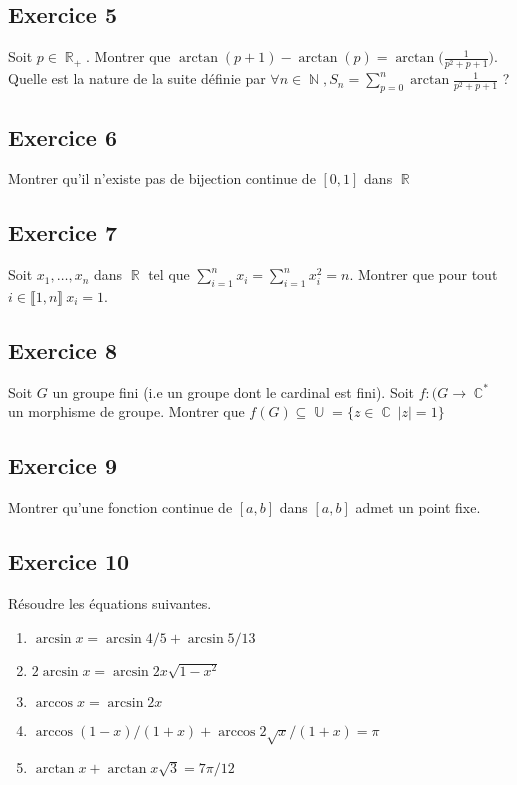 \documentclass{article}
\DeclareMathOperator{\R}{\mathbb{R}}
\DeclareMathOperator{\C}{\mathbb{C}}
\DeclareMathOperator{\N}{\mathbb{N}}
\DeclareMathOperator{\U}{\mathbb{U}}
\begin{document}
\subsection*{Exercice 5} 

Soit $p\in \R_+$. Montrer que $\displaystyle \arctan(p+1) - \arctan(p) = \arctan\bigg(\frac{1}{p^2+p+1}\bigg)$. Quelle est la nature de la suite définie par $\forall n\in \N, S_n = \displaystyle\sum_{p=0}^{n}{\arctan{\frac{1}{p^2+p+1}}}$ ?

\subsection*{Exercice 6} 

Montrer qu'il n'existe pas de bijection continue de $[0, 1]$ dans $\R$ 

\subsection*{Exercice 7} 

Soit $x_1,\dots, x_n$ dans $\R$ tel que $\sum_{i=1}^n{x_i} = \sum_{i=1}^n{x_i^2} = n$. Montrer que pour tout $i \in \llbracket1,n\rrbracket \ x_i=1$. 

\subsection*{Exercice 8}  

Soit $G$ un groupe fini (i.e un groupe dont le cardinal est fini). Soit $f : (G \to \C^*$ un morphisme de groupe. Montrer que $f(G) \subseteq \U = \{z \in \C \ |z| = 1\}$ 

\subsection*{Exercice 9} 

Montrer qu'une fonction continue de $[a, b]$ dans $[a,b]$ admet un point fixe. 

\subsection*{Exercice 10} 

Résoudre les équations suivantes. 

\begin{enumerate}
    \item $\arcsin{x}= \arcsin{4/5} + \arcsin{5/13}$ 

    \item $2\arcsin{x} = \arcsin{2x\sqrt{1-x^2}}$ 

    \item $\arccos{x}= \arcsin{2x}$ 

    \item $\arccos{(1-x)/(1+x)} + \arccos{2\sqrt{x}/(1+x)} = \pi$ 

    \item $\arctan{x}+\arctan{x\sqrt{3}} = 7\pi/12$ 
\end{enumerate}
\end{document}
